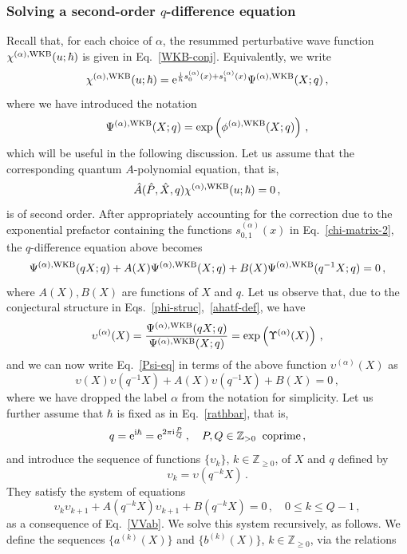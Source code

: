 \documentclass[a4paper,11pt]{article}
\theoremstyle{definition}
\def\IZ{{\mathbb Z}}
\newcommand{\re}{{\rm e}}
\newcommand{\ri}{{\rm i}}
\newcommand{\be}{\begin{equation}}
\newcommand{\ee}{\end{equation}}
\begin{document}
\subsubsection{Solving a second-order $q$-difference equation} \label{sec: 2nd-order}
Recall that, for each choice of $\alpha$, the resummed perturbative wave function $\chi^{(\alpha), \rm{WKB}}(u; \hbar)$ is given in Eq.~\eqref{WKB-conj}. Equivalently, we write
\be \label{chi-matrix-2}
\chi^{(\alpha), \rm{WKB}}(u; \hbar) = \re^{\frac{\ri}{\hbar} s^{(\alpha)}_0(x) +  s^{(\alpha)}_1(x)} \Psi^{(\alpha), \rm{WKB}}(X;q) \, ,
\ee
where we have introduced the notation
\be \label{Psi}
\Psi^{(\alpha), \rm{WKB}}(X;q) = \exp\left( \phi^{(\alpha), \rm{WKB}}(X;q)\right) \, ,
\ee
which will be useful in the following discussion. Let us assume that the corresponding quantum $A$-polynomial equation, that is, 
\be \label{Aeq-matrix}
\hat{A}(\hat{P}, \hat{X}, q) \chi^{(\alpha), \rm{WKB}}(u; \hbar) = 0 \, ,
\ee
is of second order. After appropriately accounting for the correction due to the exponential prefactor containing the functions $s^{(\alpha)}_{0,1}(x)$ in Eq.~\eqref{chi-matrix-2}, the $q$-difference equation above becomes 
%
\be \label{Psi-eq}
\Psi^{(\alpha), \rm{WKB}}(q X;q)+A(X)\Psi^{(\alpha), \rm{WKB}}(X;q)+B(X)\Psi^{(\alpha), \rm{WKB}}(q^{-1} X;q)=0 \, ,
\ee
%
where $A(X), B(X)$ are functions of $X$ and $q$.
Let us observe that, due to the conjectural structure in Eqs.~\eqref{phi-struc},~\eqref{ahatf-def}, we have
%
\be \label{uU-def}
 \upsilon^{(\alpha)} (X) = {\Psi^{(\alpha), \rm{WKB}} (q X;q) \over \Psi^{(\alpha), \rm{WKB}}(X;q)}=\exp\left( \Upsilon^{(\alpha)} (X) \right) \, , 
\ee
%
and we can now write Eq.~\eqref{Psi-eq} in terms of the above function $\upsilon^{(\alpha)} (X)$ as
\be \label{VVab}
\upsilon (X)\upsilon(q^{-1} X)+A(X) \upsilon(q^{-1} X)+B(X)=0 \, ,
\ee
where we have dropped the label $\alpha$ from the notation for simplicity.
%
Let us further assume that $\hbar$ is fixed as in Eq.~\eqref{rathbar}, that is, 
\be \label{q-rat}
q=\re^{\ri \hbar}=\re^{2 \pi \ri {P \over Q}} \, , \quad  P,Q \in \IZ_{>0} \; \; \text{coprime} \, ,
\ee
and introduce the sequence of functions $\{\upsilon_k \}$, $k \in \IZ_{\ge 0}$, of $X$ and $q$ defined by
%
\be
\upsilon_k = \upsilon (q^{-k} X)\, .
\ee
%
They satisfy the system of equations
%
\be \label{vkvk1}
\upsilon_k \upsilon_{k+1}+A(q^{-k} X) \upsilon_{k+1}+B(q^{-k} X)=0 \, , \quad 0 \le k \le Q-1 \, ,
\ee
%
as a consequence of Eq.~\eqref{VVab}. We solve this system recursively, as follows. We define the sequences $\{ a^{(k)}(X) \}$ and $\{ b^{(k)}(X) \}$, $k \in \IZ_{\ge 0}$, via the relations
\end{document}
